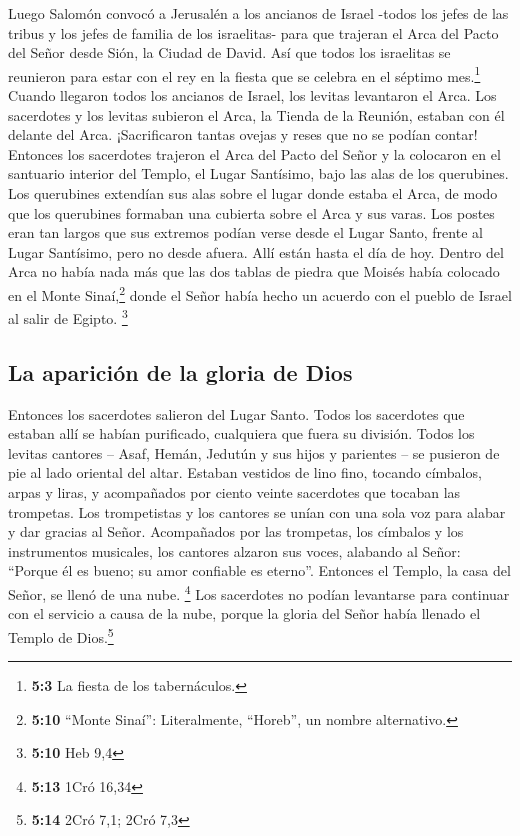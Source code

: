  Luego Salomón convocó a Jerusalén a los ancianos de
Israel -todos los jefes de las tribus y los jefes de familia de los
israelitas- para que trajeran el Arca del Pacto del Señor desde Sión, la
Ciudad de David.  Así que todos los israelitas se
reunieron para estar con el rey en la fiesta que se celebra en el
séptimo mes.\footnote{\textbf{5:3} La fiesta de los tabernáculos.}
 Cuando llegaron todos los ancianos de Israel, los levitas
levantaron el Arca.  Los sacerdotes y los levitas subieron
el Arca, la Tienda de la Reunión, estaban con él delante del Arca.
 ¡Sacrificaron tantas ovejas y reses que no se podían
contar!  Entonces los sacerdotes trajeron el Arca del
Pacto del Señor y la colocaron en el santuario interior del Templo, el
Lugar Santísimo, bajo las alas de los querubines.  Los
querubines extendían sus alas sobre el lugar donde estaba el Arca, de
modo que los querubines formaban una cubierta sobre el Arca y sus varas.
 Los postes eran tan largos que sus extremos podían verse
desde el Lugar Santo, frente al Lugar Santísimo, pero no desde afuera.
Allí están hasta el día de hoy.  Dentro del Arca no había
nada más que las dos tablas de piedra que Moisés había colocado en el
Monte Sinaí,\footnote{\textbf{5:10} ``Monte Sinaí'': Literalmente,
  ``Horeb'', un nombre alternativo.} donde el Señor había hecho un
acuerdo con el pueblo de Israel al salir de Egipto. \footnote{\textbf{5:10}
  Heb 9,4}

\hypertarget{la-apariciuxf3n-de-la-gloria-de-dios}{%
\subsection{La aparición de la gloria de
Dios}\label{la-apariciuxf3n-de-la-gloria-de-dios}}

 Entonces los sacerdotes salieron del Lugar Santo. Todos
los sacerdotes que estaban allí se habían purificado, cualquiera que
fuera su división.  Todos los levitas cantores -- Asaf,
Hemán, Jedutún y sus hijos y parientes -- se pusieron de pie al lado
oriental del altar. Estaban vestidos de lino fino, tocando címbalos,
arpas y liras, y acompañados por ciento veinte sacerdotes que tocaban
las trompetas.  Los trompetistas y los cantores se unían
con una sola voz para alabar y dar gracias al Señor. Acompañados por las
trompetas, los címbalos y los instrumentos musicales, los cantores
alzaron sus voces, alabando al Señor: ``Porque él es bueno; su amor
confiable es eterno''. Entonces el Templo, la casa del Señor, se llenó
de una nube. \footnote{\textbf{5:13} 1Cró 16,34}  Los
sacerdotes no podían levantarse para continuar con el servicio a causa
de la nube, porque la gloria del Señor había llenado el Templo de
Dios.\footnote{\textbf{5:14} 2Cró 7,1; 2Cró 7,3}

